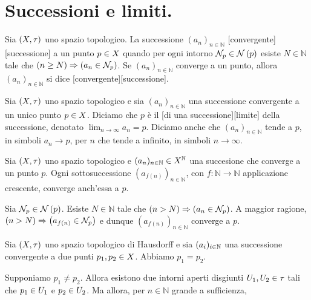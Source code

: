 \section{Successioni e limiti.}
\label{Topologia_SuccessioniELimiti}
\begin{Definition}
	Sia $(X,\tau)$ uno spazio topologico.
	La successione $(a_n)_{n \in \mathbb{N}}$
	[convergente][successione] a un punto
	$p \in X$
	quando per ogni intorno $\Neighborhood_p \in \Neighborhoods{p}$ esiste
	$N \in \mathbb{N}$ tale che $\left ( n \geq N \right ) \Rightarrow \left ( 
	a_n \in \mathcal{N}_p \right )$.
	Se $(a_n)_{n \in \mathbb{N}}$ converge a un punto, allora $(a_n)_{n \in \mathbb{N}}$ si dice [convergente][successione].
\end{Definition}
\begin{Definition}
	Sia $(X,\tau)$ uno spazio topologico
	e sia $(a_n)_{n \in \mathbb{N}}$ una successione
	convergente a un unico punto $p \in X$. Diciamo
	che $p$ \`e il
	[di una successione][limite] della successione,
	denotato $\lim_{n \rightarrow \infty} a_n = p$.
	Diciamo anche che $(a_n)_{n \in \mathbb{N}}$ tende a $p$, in simboli
	$a_n \rightarrow p$, per $n$ che tende a infinito,
	in simboli $n \rightarrow \infty$.
\end{Definition}
\begin{Theorem}
	Sia $(X,\tau)$ uno spazio topologico e
  $(a_n)_{n \in \mathbb{N}} \in X^\mathbb{N}$ una succesione
  che converge a un punto $p$. Ogni sottosuccessione
  $(a_{f(n)})_{n \in \mathbb{N}}$,
  con $f: \mathbb{N} \rightarrow \mathbb{N}$ applicazione crescente,
  converge anch'essa a $p$.
\end{Theorem}
\Proof Sia $\Neighborhood_p \in \Neighborhoods{p}$. Esiste $N \in \mathbb{N}$ tale che $\left ( n > N \right ) \Rightarrow \left ( a_n \in \mathcal{N}_p \right )$. A maggior ragione, $\left ( n > N \right ) \Rightarrow \left ( a_{f(n)} \in \mathcal{N}_p \right )$ e dunque $(a_{f(n)})_{n \in \mathbb{N}}$ converge a $p$. \EndProof
\begin{Theorem}
	Sia $(X,\tau)$ uno spazio topologico di
	Hausdorff e sia $(a_i)_{i \in \mathbb{N}}$ una
	successione convergente a due punti $p_1, p_2 \in
	X$. Abbiamo $p_1 = p_2$.
\end{Theorem}
\Proof Supponiamo $p_1 \neq p_2$. Allora esistono due intorni aperti
disgiunti $U_1, U_2 \in \tau$ tali che $p_1 \in U_1$ e
$p_2 \in U_2$. Ma allora, per $n \in \mathbb{N}$ grande a sufficienza,
